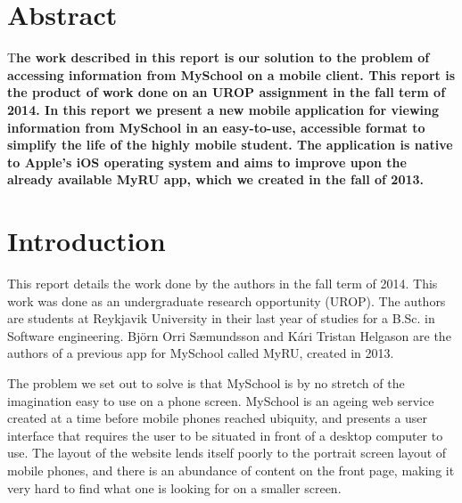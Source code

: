 \documentclass[pdftex, DIV=calc, paper=a4, fontsize=11pt]{scrartcl}	 %
\newcommand{\initial}[1]{ %
\lettrine[lines=3,lhang=0.3,nindent=0em]{
\color{DarkGray}
{\textsf{#1}}}{}}
\begin{document}


\thispagestyle{fancy} %
\setcounter{page}{1}

\section*{Abstract}
\initial{T}\textbf{he work described in this report is our solution to the problem of accessing
information from MySchool on a mobile client. This report is the product of work done on an UROP
assignment in the fall term of 2014. In this report we present a new mobile application
for viewing information from MySchool in an easy-to-use, accessible format to simplify the life
of the highly mobile student. The application is native to Apple's iOS operating system and
aims to improve upon the already available MyRU app, which we created in the fall of 2013.}

\pagebreak

\tableofcontents

\pagebreak


\section{Introduction}

This report details the work done by the authors in the fall term of 2014. This work was done
as an undergraduate research opportunity (UROP). The authors are students at Reykjavik University
in their last year of studies for a B.Sc. in Software engineering. Björn Orri Sæmundsson and 
Kári Tristan Helgason are the authors of a previous app for MySchool\cite{myschool}
called MyRU\cite{myru}, created in 2013. 

The problem we set out to solve is that MySchool is by no stretch of the imagination easy to use
on a phone screen. MySchool is an ageing web service created at a time before mobile phones
reached ubiquity, and presents a user interface that requires the
user to be situated in front of a desktop computer to use. The layout of the website lends itself
poorly to the portrait screen layout of mobile phones, and there is an abundance of content on the
front page, making it very hard to find what one is looking for on a smaller screen.
\end{document}
